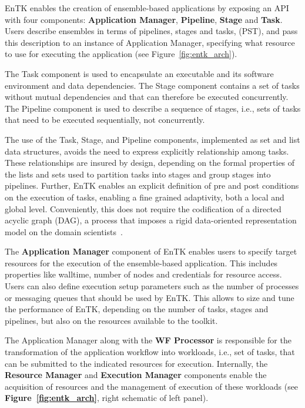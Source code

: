 EnTK enables the creation of ensemble-based applications by exposing an API
with four components: \textbf{Application Manager}, \textbf{Pipeline},
\textbf{Stage} and \textbf{Task}. Users describe ensembles in terms of
pipelines, stages and tasks, (PST), and pass this description to an instance
of Application Manager, specifying what resource to use for executing the
application (see Figure~\ref{fig:entk_arch}).


The Task component is used to encapsulate an executable and its software
environment and data dependencies. The Stage component contains a set of
tasks without mutual dependencies and that can therefore be executed
concurrently. The Pipeline component is used to describe a sequence of
stages, i.e., sets of tasks that need to be executed sequentially, not
concurrently.

The use of the Task, Stage, and Pipeline components, implemented as set and
list data structures, avoids the need to express explicitly relationship
among tasks. These relationships are insured by design, depending on the
formal properties of the lists and sets used to partition tasks into stages
and group stages into pipelines. Further, EnTK enables an explicit definition
of pre and post conditions on the execution of tasks, enabling a fine grained
adaptivity, both a local and global level. Conveniently, this does not
require the codification of a directed acyclic graph (DAG), a process that
imposes a rigid data-oriented    representation model
on the domain scientists~\cite{balasubramanian2017powerofmany}.

The \textbf{Application Manager} component of EnTK enables users to specify
target resources for the execution of the ensemble-based application. This
includes properties like walltime, number of nodes and credentials for
resource access. Users can also define execution setup parameters such as the
number of processes or messaging queues that should be used by EnTK\@. This
allows to size and tune the performance of EnTK, depending on the number of
tasks, stages and pipelines, but also on the resources available to the
toolkit.

The Application Manager along with the \textbf{WF Processor} is responsible
for the transformation of the application workflow into workloads, i.e., set
of tasks, that can be submitted to the indicated resources for execution.
Internally, the \textbf{Resource Manager} and \textbf{Execution Manager}
components enable the acquisition of resources and the management of
execution of these workloads (see \textbf{Figure~\ref{fig:entk_arch}}, right
schematic of left panel).